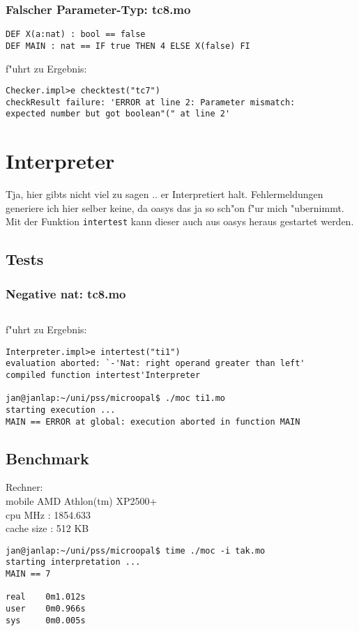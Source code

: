 \documentclass[a4paper,12pt]{report}
\begin{document}
\subsection{Falscher Parameter-Typ: tc8.mo} \begin{verbatim}
DEF X(a:nat) : bool == false
DEF MAIN : nat == IF true THEN 4 ELSE X(false) FI
\end{verbatim}
f"uhrt zu Ergebnis:
\begin{verbatim}
Checker.impl>e checktest("tc7")
checkResult failure: 'ERROR at line 2: Parameter mismatch: 
expected number but got boolean"(" at line 2'
\end{verbatim}

\chapter{Interpreter}
Tja, hier gibts nicht viel zu sagen .. er Interpretiert halt. Fehlermeldungen generiere ich hier selber keine, da oasys das ja so sch"on f"ur mich "ubernimmt. Mit der Funktion \texttt{intertest} kann dieser auch aus oasys heraus gestartet werden.

\section{Tests}
\subsection{Negative nat: tc8.mo} \begin{verbatim}
\end{verbatim}
f"uhrt zu Ergebnis:
\begin{verbatim}
Interpreter.impl>e intertest("ti1")
evaluation aborted: `-'Nat: right operand greater than left'
compiled function intertest'Interpreter

jan@janlap:~/uni/pss/microopal$ ./moc ti1.mo
starting execution ...
MAIN == ERROR at global: execution aborted in function MAIN
\end{verbatim}

\section{Benchmark}
Rechner:\\
mobile AMD Athlon(tm) XP2500+\\
cpu MHz         : 1854.633\\
cache size      : 512 KB
\begin{verbatim}
jan@janlap:~/uni/pss/microopal$ time ./moc -i tak.mo
starting interpretation ...
MAIN == 7

real    0m1.012s
user    0m0.966s
sys     0m0.005s
\end{verbatim}
\end{document}
